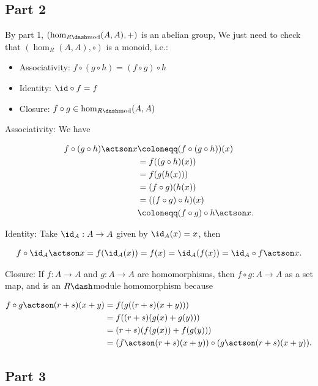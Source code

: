 \hypertarget{part-2-2}{%
\subsection{Part 2}\label{part-2-2}}

By part 1, \((\hom_{R\dash\text{mod}}(A, A), +)\) is an abelian group,
We just need to check that \((\hom_R(A, A), \circ)\) is a monoid, i.e.:

\begin{itemize}
\tightlist
\item
  Associativity: \(f \circ (g\circ h) = (f\circ g) \circ h\)
\item
  Identity: \(\id \circ f = f\)
\item
  Closure: \(f\circ g \in \hom_{R\dash\text{mod}}(A, A)\)
\end{itemize}

Associativity: We have

\begin{align*}
f\circ (g\circ h) \actson x &\coloneqq (f \circ (g \circ h))(x) \\
&= f((g\circ h)(x)) \\
&= f(g(h(x))) \\
&= (f\circ g)(h(x)) \\
&= ((f\circ g) \circ h)(x)\\
&\coloneqq (f \circ g) \circ h \actson x
.\end{align*}

Identity: Take \(\id_A: A \to A\) given by \(\id_A(x) = x\), then

\begin{align*}
f\circ \id_A \actson x = f(\id_A(x)) = f(x) = \id_A(f(x)) = \id_A \circ f \actson x
.\end{align*}

Closure: If \(f: A\to A\) and \(g: A\to A\) are homomorphisms, then
\(f\circ g: A \to A\) as a set map, and is an \(R\dash\)module
homomorphism because

\begin{align*}
f\circ g \actson (r+s)(x+y) &= f(g((r+s)(x+y)))\\
&= f((r+s)(g(x) + g(y))) \\
&= (r+s)(f(g(x)) + f(g(y))) \\
&= (f \actson (r+s)(x+y)) \circ (g \actson (r+s)(x+y))
.\end{align*}

\hypertarget{part-3}{%
\subsection{Part 3}\label{part-3}}

